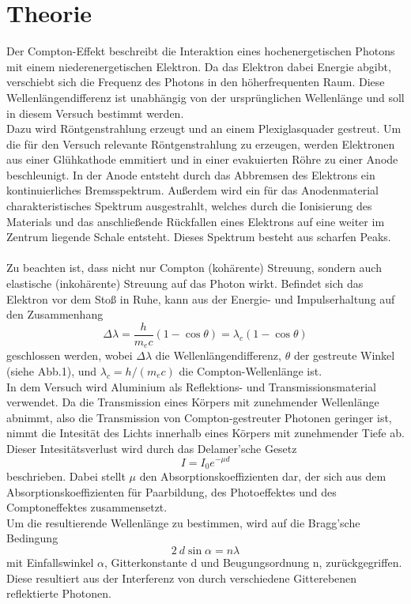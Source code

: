 \section{Theorie}
\label{sec:Theorie}
    Der Compton-Effekt beschreibt die Interaktion eines hochenergetischen Photons mit einem 
    niederenergetischen Elektron. Da das Elektron dabei Energie abgibt, verschiebt sich 
    die Frequenz des Photons in den höherfrequenten Raum. Diese Wellenlängendifferenz
    ist unabhängig von der ursprünglichen Wellenlänge und soll in diesem Versuch bestimmt 
    werden.\\
    Dazu wird Röntgenstrahlung erzeugt und an einem Plexiglasquader gestreut. Um die für 
    den Versuch relevante Röntgenstrahlung zu erzeugen, werden Elektronen aus einer 
    Glühkathode emmitiert und in einer evakuierten Röhre zu einer Anode beschleunigt. In der Anode
    entsteht durch das Abbremsen des Elektrons ein kontinuierliches Bremsspektrum. Außerdem 
    wird ein für das Anodenmaterial charakteristisches Spektrum ausgestrahlt, welches durch die 
    Ionisierung des Materials und das anschließende Rückfallen eines Elektrons auf eine weiter im 
    Zentrum liegende Schale entsteht. Dieses Spektrum besteht aus scharfen Peaks. \\
    \\
    Zu beachten ist, dass nicht nur Compton (kohärente) Streuung, sondern auch
    elastische (inkohärente) Streuung auf das Photon wirkt. Befindet sich das Elektron 
    vor dem Stoß in Ruhe, kann aus der Energie- und Impulserhaltung auf den Zusammenhang
    \begin{equation*}
        \Delta \lambda = \dfrac{h}{m_e c}(1-\cos{\theta})=\lambda_c(1-\cos{\theta})
    \end{equation*}
    geschlossen werden, wobei $\Delta \lambda$ die Wellenlängendifferenz, $\theta$ der 
    gestreute Winkel (siehe Abb.1), und $\lambda_c=h/(m_e c)$ die Compton-Wellenlänge ist.\\
    In dem Versuch wird Aluminium als Reflektions- und Transmissionsmaterial verwendet.
    Da die Transmission eines Körpers mit zunehmender Wellenlänge abnimmt, also die Transmission
    von Compton-gestreuter Photonen geringer ist, nimmt die Intesität des Lichts innerhalb eines 
    Körpers mit zunehmender Tiefe ab. Dieser Intesitätsverlust wird durch das Delamer'sche Gesetz
    \begin{equation}
        I = I_0 e^{-\mu d}
    \end{equation}
    beschrieben. Dabei stellt $\mu$ den Absorptionskoeffizienten dar, der sich aus dem 
    Absorptionskoeffizienten für Paarbildung, des Photoeffektes und des Comptoneffektes 
    zusammensetzt.\\
    Um die resultierende Wellenlänge zu bestimmen, wird auf die Bragg'sche Bedingung
    \begin{equation}
        2 \ d \sin{\alpha} = n\lambda
    \end{equation}
    mit Einfallswinkel $\alpha$, Gitterkonstante d und Beugungsordnung n, zurückgegriffen.
    Diese resultiert aus der Interferenz von durch verschiedene Gitterebenen reflektierte
    Photonen.

